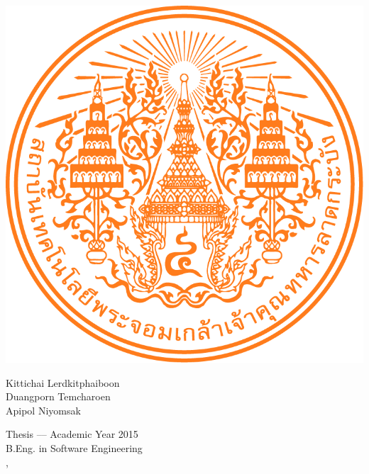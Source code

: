 \thispagestyle{empty}
\begin{center}

    \centering
    \includegraphics[width=0.3\linewidth]{res/kmitl_logo.png}
    \vspace{3cm}
    
    \Large\MakeUppercase{\dms}
    \vspace{3cm}
    
    {\Large 
    Kittichai Lerdkitphaiboon \\ 
    Duangporn Temcharoen \\
    Apipol Niyomsak
    \par}
    
    \vfill
    
    {\Large Thesis --– Academic Year 2015 \\
    B.Eng. in Software Engineering \\
    \IC, \kmitl\par}

\end{center}